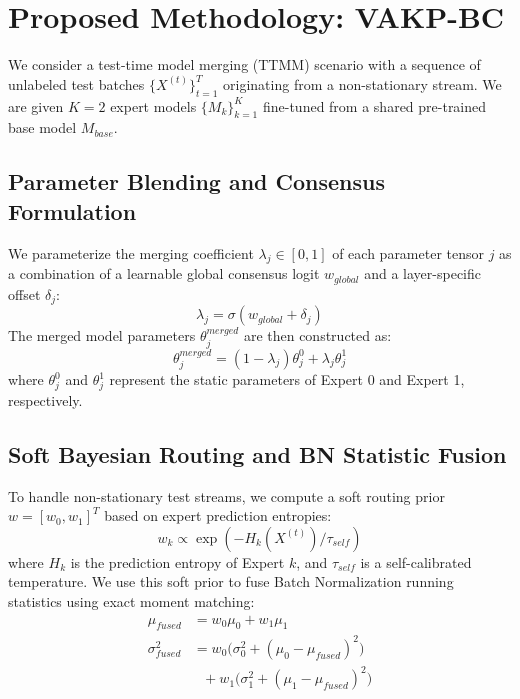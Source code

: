 \documentclass{article}
\theoremstyle{plain}
\theoremstyle{definition}
\theoremstyle{remark}
\begin{document}
\section{Proposed Methodology: VAKP-BC}
\label{sec:method}

We consider a test-time model merging (TTMM) scenario with a sequence of unlabeled test batches $\{X^{(t)}\}_{t=1}^T$ originating from a non-stationary stream. We are given $K=2$ expert models $\{M_k\}_{k=1}^K$ fine-tuned from a shared pre-trained base model $M_{base}$.

\subsection{Parameter Blending and Consensus Formulation}
We parameterize the merging coefficient $\lambda_j \in [0, 1]$ of each parameter tensor $j$ as a combination of a learnable global consensus logit $w_{global}$ and a layer-specific offset $\delta_j$:
\begin{equation}
    \lambda_j = \sigma(w_{global} + \delta_j)
\end{equation}
The merged model parameters $\theta^{merged}_j$ are then constructed as:
\begin{equation}
    \theta^{merged}_j = (1 - \lambda_j) \theta_j^0 + \lambda_j \theta_j^1
\end{equation}
where $\theta_j^0$ and $\theta_j^1$ represent the static parameters of Expert 0 and Expert 1, respectively. 

\subsection{Soft Bayesian Routing and BN Statistic Fusion}
To handle non-stationary test streams, we compute a soft routing prior $w = [w_0, w_1]^T$ based on expert prediction entropies:
\begin{equation}
    w_k \propto \exp(-H_k(X^{(t)}) / \tau_{self})
\end{equation}
where $H_k$ is the prediction entropy of Expert $k$, and $\tau_{self}$ is a self-calibrated temperature. We use this soft prior to fuse Batch Normalization running statistics using exact moment matching:
\begin{align}
    \mu_{fused} &= w_0 \mu_0 + w_1 \mu_1 \\
    \sigma^2_{fused} &= w_0 \big(\sigma^2_0 + (\mu_0 - \mu_{fused})^2\big) \nonumber \\
    &~~~ + w_1 \big(\sigma^2_1 + (\mu_1 - \mu_{fused})^2\big)
\end{align}
\end{document}
